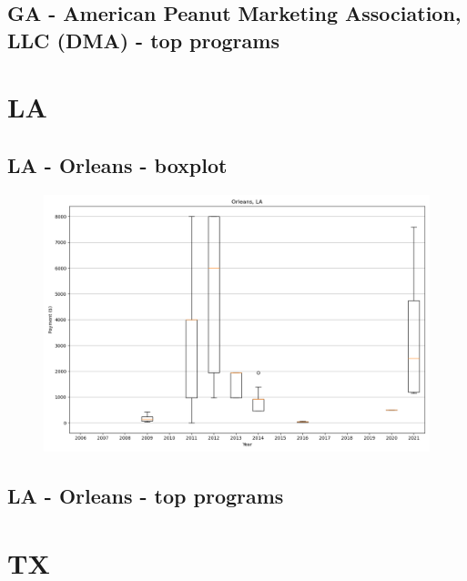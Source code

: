\subsection*{GA - American Peanut Marketing Association, LLC (DMA) - top programs}

\newpage
\section*{LA}
\subsection*{LA - Orleans - boxplot}
\begin{figure}[h]
\centering
\includegraphics[width=7in]{../output/boxplots/counties/Orleans-LA_boxplot.png}
\end{figure}


\subsection*{LA - Orleans - top programs}

\newpage
\section*{TX}
